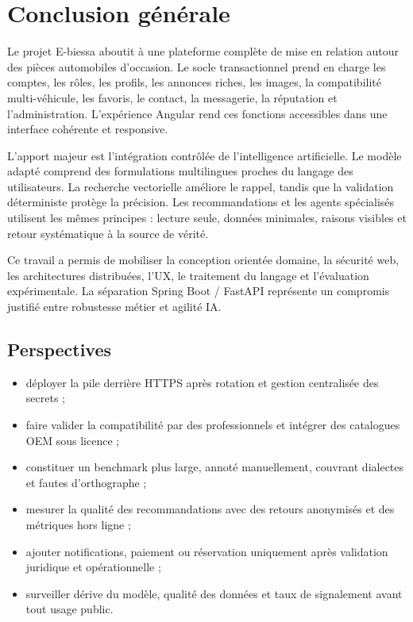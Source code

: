 \chapter*{Conclusion générale}

Le projet E-biessa aboutit à une plateforme complète de mise en relation autour des pièces automobiles d'occasion. Le socle transactionnel prend en charge les comptes, les rôles, les profils, les annonces riches, les images, la compatibilité multi-véhicule, les favoris, le contact, la messagerie, la réputation et l'administration. L'expérience Angular rend ces fonctions accessibles dans une interface cohérente et responsive.


L'apport majeur est l'intégration contrôlée de l'intelligence artificielle. Le modèle adapté comprend des formulations multilingues proches du langage des utilisateurs. La recherche vectorielle améliore le rappel, tandis que la validation déterministe protège la précision. Les recommandations et les agents spécialisés utilisent les mêmes principes : lecture seule, données minimales, raisons visibles et retour systématique à la source de vérité.


Ce travail a permis de mobiliser la conception orientée domaine, la sécurité web, les architectures distribuées, l'UX, le traitement du langage et l'évaluation expérimentale. La séparation Spring Boot / FastAPI représente un compromis justifié entre robustesse métier et agilité IA.


\section{Perspectives}

\begin{itemize}
\item déployer la pile derrière HTTPS après rotation et gestion centralisée des secrets ;

\item faire valider la compatibilité par des professionnels et intégrer des catalogues OEM sous licence ;

\item constituer un benchmark plus large, annoté manuellement, couvrant dialectes et fautes d'orthographe ;

\item mesurer la qualité des recommandations avec des retours anonymisés et des métriques hors ligne ;

\item ajouter notifications, paiement ou réservation uniquement après validation juridique et opérationnelle ;

\item surveiller dérive du modèle, qualité des données et taux de signalement avant tout usage public.
\end{itemize}
